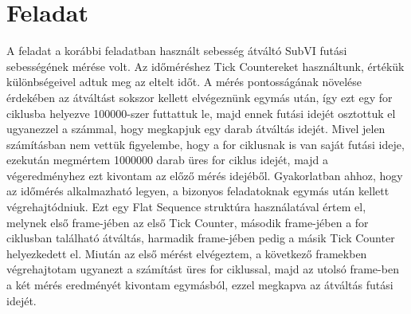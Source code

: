 \documentclass[10pt, conference,a4paper]{ITKproc}
\begin{document}
\section{Feladat}
A feladat a korábbi feladatban használt sebesség átváltó SubVI futási sebességének mérése volt. Az időméréshez Tick Countereket használtunk, értékük különbségeivel adtuk meg az eltelt időt. A mérés pontosságának növelése érdekében az átváltást sokszor kellett elvégeznünk egymás után, így ezt egy for ciklusba helyezve 100000-szer futtattuk le, majd ennek futási idejét osztottuk el ugyanezzel a számmal, hogy megkapjuk egy darab átváltás idejét. Mivel jelen számításban nem vettük figyelembe, hogy a for ciklusnak is van saját futási ideje, ezekután megmértem 1000000 darab üres for ciklus idejét, majd a végeredményhez ezt kivontam az előző mérés idejéből. Gyakorlatban ahhoz, hogy az időmérés alkalmazható legyen, a bizonyos feladatoknak egymás után kellett végrehajtódniuk. Ezt egy Flat Sequence struktúra használatával értem el, melynek első frame-jében az első Tick Counter, második frame-jében a for ciklusban található átváltás, harmadik frame-jében pedig a másik Tick Counter helyezkedett el. Miután az első mérést elvégeztem, a következő framekben végrehajtotam ugyanezt a számítást üres for ciklussal, majd az utolsó frame-ben a két mérés eredményét kivontam egymásból, ezzel megkapva az átváltás futási idejét. 
\end{document}
